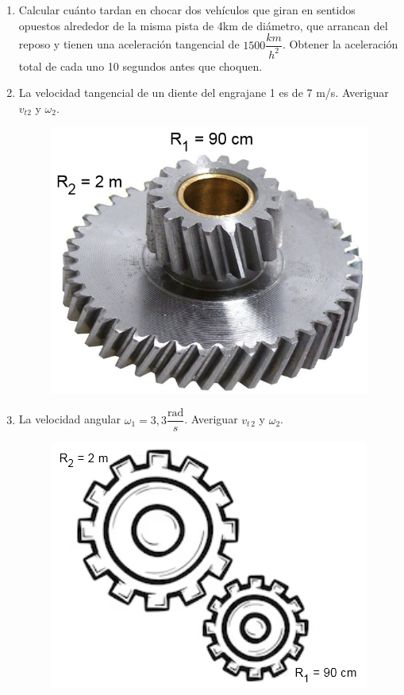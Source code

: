 \begin{enumerate}[label=\arabic*)]
\item Calcular cuánto tardan en chocar dos vehículos que giran en sentidos opuestos alrededor de la misma pista de 4km de diámetro, que arrancan del reposo y tienen una aceleración tangencial de $1500 \dfrac{km}{h^2}$. Obtener la aceleración total de cada uno 10 segundos antes que choquen.

\item La velocidad tangencial de un diente del engrajane 1 es de 7 m/s. Averiguar $v_{t2}$ y $\omega_2$.

\begin{figure}[H]
    \centering
    \includegraphics[width=0.3\linewidth]{images/engranaje_1.png}
\end{figure}

\item La velocidad angular $\omega_1 = 3,3\dfrac{\text{rad}}{s}$. Averiguar $v_{t\,2}$ y $\omega_2$.

\begin{figure}[H]
    \centering
    \includegraphics[width=0.4\linewidth]{images/engranaje_2.png}
\end{figure}    
\end{enumerate}

